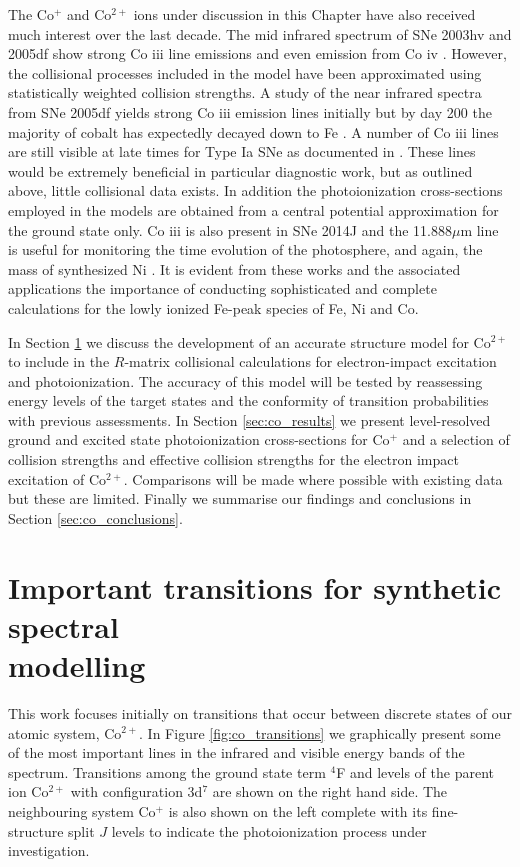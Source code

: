 The Co$^{+}$ and Co$^{2+}$ ions under discussion in this Chapter have also received much interest over the last decade. The mid infrared spectrum of SNe 2003hv and 2005df show strong Co {\sc iii} line emissions and even emission from Co {\sc iv} \citep{2007ApJ...661..995G}. However, the collisional processes included in the model have been approximated using statistically weighted collision strengths. A study of the near infrared spectra from SNe 2005df yields strong Co {\sc iii} emission lines initially but by day 200 the majority of cobalt has expectedly decayed down to Fe \citep{2015ApJ...806..107D}. A number of Co {\sc iii} lines are still visible at late times for Type Ia SNe as documented in \citep{1995ASPC...78..291R}. These lines would be extremely beneficial in particular diagnostic work, but as outlined above, little collisional data exists. In addition the photoionization cross-sections employed in the models are obtained from a central potential approximation \citep{1979ApJS...40..815R} for the ground state only. Co {\sc iii} is also present in SNe 2014J and the 11.888$\mu$m line is useful for monitoring the time evolution of the photosphere, and again, the mass of synthesized Ni \citep{2015ApJ...798...93T}. It is evident from these works and the associated applications the importance of conducting sophisticated and complete calculations for the lowly ionized Fe-peak species of Fe, Ni and Co.

In Section \ref{sec:co_structure} we discuss the development of an accurate structure model for Co$^{2+}$ to include in the $R$-matrix collisional calculations for electron-impact excitation and photoionization. The accuracy of this model will be tested by reassessing energy levels of the target states and the conformity of transition probabilities with previous assessments. In Section \ref{sec:co_results} we present level-resolved ground and excited state photoionization cross-sections for Co$^{+}$ and a selection of collision strengths and effective collision strengths for the electron impact excitation of Co$^{2+}$. Comparisons will be made where possible with existing data but these are limited. Finally we summarise our findings and conclusions in Section \ref{sec:co_conclusions}.
\section{Important transitions for synthetic spectral\\ modelling}\label{sec:co_structure}
This work focuses initially on transitions that occur between discrete states of our atomic system, Co$^{2+}$. In Figure \ref{fig:co_transitions} we graphically present some of the most important lines in the infrared and visible energy bands of the spectrum. Transitions among the ground state term $^4$F and levels of the parent ion Co$^{2+}$ with configuration 3d$^7$ are shown on the right hand side. The neighbouring system Co$^{+}$ is also shown on the left complete with its fine-structure split $J$ levels to indicate the photoionization process under investigation. 


